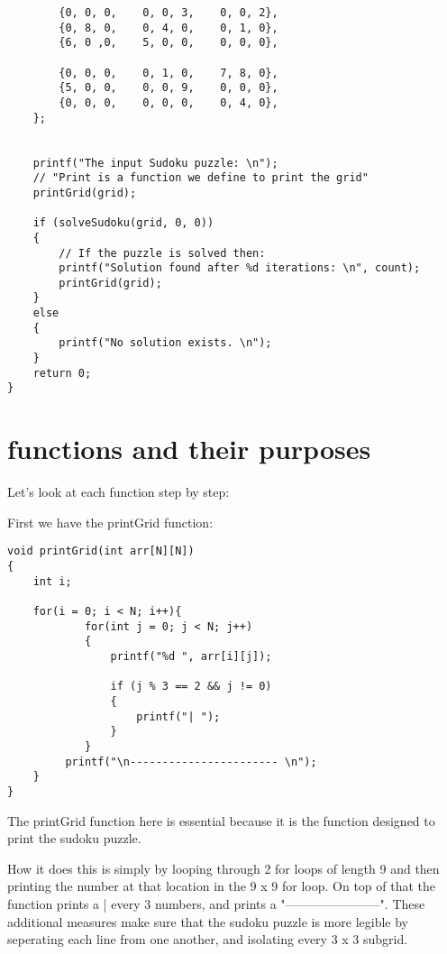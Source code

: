 \documentclass{article}
\begin{document}
\begin{verbatim}
        {0, 0, 0,    0, 0, 3,    0, 0, 2},
        {0, 8, 0,    0, 4, 0,    0, 1, 0},
        {6, 0 ,0,    5, 0, 0,    0, 0, 0},
        
        {0, 0, 0,    0, 1, 0,    7, 8, 0},
        {5, 0, 0,    0, 0, 9,    0, 0, 0},
        {0, 0, 0,    0, 0, 0,    0, 4, 0},
    };


    printf("The input Sudoku puzzle: \n");
    // "Print is a function we define to print the grid"
    printGrid(grid);

    if (solveSudoku(grid, 0, 0))
    {
        // If the puzzle is solved then:
        printf("Solution found after %d iterations: \n", count);
        printGrid(grid);
    }
    else
    {
        printf("No solution exists. \n");
    }
    return 0;
}   
\end{verbatim}


\section{functions and their purposes}
Let's look at each function step by step:

First we have the printGrid function:
\begin{verbatim}
void printGrid(int arr[N][N])
{
    int i;
    
	for(i = 0; i < N; i++){
            for(int j = 0; j < N; j++)
            {
                printf("%d ", arr[i][j]);
                
                if (j % 3 == 2 && j != 0)
                {
                    printf("| ");
                }
            }
         printf("\n----------------------- \n");
	}
}  
\end{verbatim}
The printGrid function here is essential because it
is the function designed to print the sudoku puzzle.

How it does this is simply by looping through 2 for loops
of length 9 and then printing the number at that location in the
9 x 9 for loop. On top of that the function prints a |
every 3 numbers, and prints a "-----------------------".
These additional measures make sure that the sudoku puzzle is more legible
by seperating each line from one another, and isolating every
3 x 3 subgrid.
\end{document}
